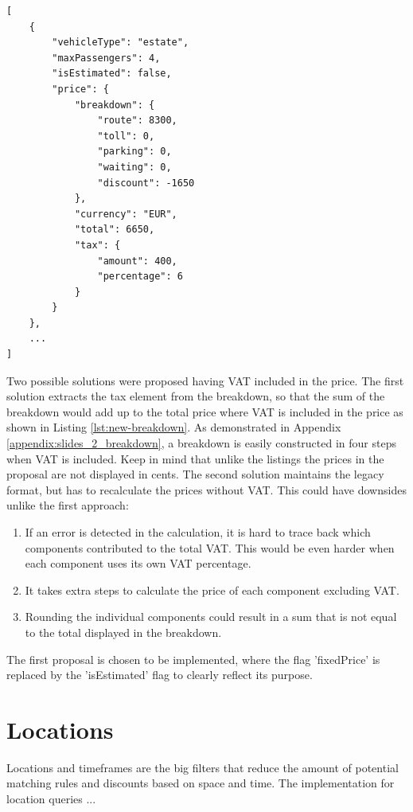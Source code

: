 \begin{lstlisting}[caption={Improved price breakdown}, label={lst:new-breakdown}]
[
	{
		"vehicleType": "estate",
		"maxPassengers": 4,
		"isEstimated": false,
		"price": {
			"breakdown": {
				"route": 8300,
				"toll": 0,
				"parking": 0,
				"waiting": 0,
				"discount": -1650
			},
			"currency": "EUR",
			"total": 6650,
			"tax": {
				"amount": 400,
				"percentage": 6
			}
		}
	},
	...
]
\end{lstlisting}

Two possible solutions were proposed having VAT included in the price. The first solution extracts the tax element from the breakdown, so that the sum of the breakdown would add up to the total price where VAT is included in the price as shown in Listing \ref{lst:new-breakdown}. As demonstrated in Appendix \ref{appendix:slides_2_breakdown}, a breakdown is easily constructed in four steps when VAT is included. Keep in mind that unlike the listings the prices in the proposal are not displayed in cents. The second solution maintains the legacy format, but has to recalculate the prices without VAT. This could have downsides unlike the first approach:

\begin{enumerate}
	\item If an error is detected in the calculation, it is hard to trace back which components contributed to the total VAT. This would be even harder when each component uses its own VAT percentage.
	\item It takes extra steps to calculate the price of each component excluding VAT.
	\item Rounding the individual components could result in a sum that is not equal to the total displayed in the breakdown.
\end{enumerate}

The first proposal is chosen to be implemented, where the flag 'fixedPrice' is replaced by the 'isEstimated' flag to clearly reflect its purpose.

%
\section{Locations}
Locations and timeframes are the big filters that reduce the amount of potential matching rules and discounts based on space and time. The implementation for location queries ...

